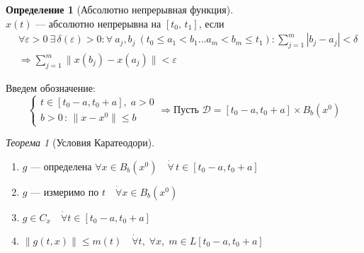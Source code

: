 \documentclass[oneside, final, 14pt, draft]{article}
\theoremstyle{definition}
\theoremstyle{definition}
\newtheorem{defin}{Определение}[section]
\theoremstyle{remark}
\theoremstyle{theorem}
\newtheorem{thm}{Теорема}[section]
\renewcommand{\leq}{\leqslant}
\begin{document}
\begin{defin} [Абсолютно непрерывная функция]\ \\
$x(t)$ --- абсолютно непрерывна на $[t_0,\,t_1]$, если
   \begin{align*}
    &\forall \varepsilon > 0\ \exists\, \delta (\varepsilon) > 0 : \forall\ a_j, b_j\ (t_0 \leq a_1 < b_1\ldots a_m<b_m\leq t_1) : \sum\limits_{j = 1}^{m}|b_j - a_j| < \delta\\
    &\Rightarrow \sum\limits_{j = 1}^{m}\|x(b_j) - x(a_j)\| < \varepsilon
   \end{align*}
\end{defin}

{\flushleft Введем обозначение:}
$$
\begin{cases}
t \in [t_0 - a, t_0 + a],\; a > 0\\
b > 0\,:\, \| x - x^0\| \leq b
\end{cases}
\Rightarrow \text{Пусть } \mathcal{D} = [t_0 - a, t_0 + a] \times B_b(x^0)
$$

\begin{thm}[Условия Каратеодори]\ 
\begin{enumerate}
    \item $g \text{ --- определена } \forall x \in B_b(x^0)\quad \dot\forall\, t \in [t_0 - a, t_0 + a]$
    \item $g$ --- измеримо по $t\quad \dot\forall x \in B_b(x^0)$
    \item $g \in C_x\quad \dot{\forall} t \in [t_0 - a, t_0 + a]$
    \item $\| g(t, x)\| \leq m(t)\quad \dot{\forall} t,\; \forall x,\; m \in L [t_0 - a, t_0 + a]$
\end{enumerate}
\end{thm}
\end{document}
